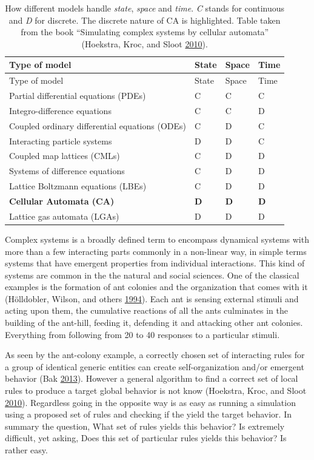 \documentclass[
]{book}
\begin{document}
\begin{longtable}[]{@{}llll@{}}
\caption{\label{tab:models} How different models handle \emph{state}, \emph{space} and \emph{time}. \emph{C} stands for continuous and \emph{D} for discrete. The discrete nature of CA is highlighted.
Table taken from the book ``Simulating complex systems by cellular automata'' (Hoekstra, Kroc, and Sloot \protect\hyperlink{ref-hoekstra2010simulating}{2010}).}\tabularnewline
\toprule
Type of model & State & Space & Time\tabularnewline
\midrule
\endfirsthead
\toprule
Type of model & State & Space & Time\tabularnewline
\midrule
\endhead
Partial differential equations (PDEs) & C & C & C\tabularnewline
Integro-difference equations & C & C & D\tabularnewline
Coupled ordinary differential equations (ODEs) & C & D & C\tabularnewline
Interacting particle systems & D & D & C\tabularnewline
Coupled map lattices (CMLs) & C & D & D\tabularnewline
Systems of difference equations & C & D & D\tabularnewline
Lattice Boltzmann equations (LBEs) & C & D & D\tabularnewline
\textbf{Cellular Automata (CA)} & \textbf{D} & \textbf{D} & \textbf{D}\tabularnewline
Lattice gas automata (LGAs) & D & D & D\tabularnewline
\bottomrule
\end{longtable}

Complex systems is a broadly defined term to encompass dynamical systems with more than a few interacting parts commonly in a non-linear way, in simple terms systems that have emergent properties from individual interactions. This kind of systems are common in the the natural and social sciences. One of the classical examples is the formation of ant colonies and the organization that comes with it (Hölldobler, Wilson, and others \protect\hyperlink{ref-holldobler1994journey}{1994}). Each ant is sensing external stimuli and acting upon them, the cumulative reactions of all the ants culminates in the building of the ant-hill, feeding it, defending it and attacking other ant colonies. Everything from following from 20 to 40 responses to a particular stimuli.

As seen by the ant-colony example, a correctly chosen set of interacting rules for a group of identical generic entities can create self-organization and/or emergent behavior (Bak \protect\hyperlink{ref-bak2013nature}{2013}). However a general algorithm to find a correct set of local rules to produce a target global behavior is not know (Hoekstra, Kroc, and Sloot \protect\hyperlink{ref-hoekstra2010simulating}{2010}). Regardless going in the opposite way is as easy as running a simulation using a proposed set of rules and checking if the yield the target behavior.
In summary the question, What set of rules yields this behavior? Is extremely difficult, yet asking, Does this set of particular rules yields this behavior? Is rather easy.
\end{document}

